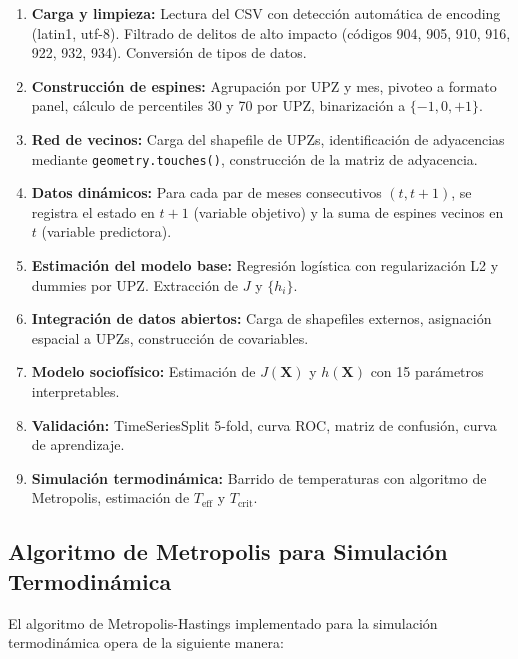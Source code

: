\documentclass[12pt,a4paper]{article}
\begin{document}
\begin{enumerate}
    \item \textbf{Carga y limpieza:} Lectura del CSV con detección automática de encoding (latin1, utf-8). Filtrado de delitos de alto impacto (códigos 904, 905, 910, 916, 922, 932, 934). Conversión de tipos de datos.
    
    \item \textbf{Construcción de espines:} Agrupación por UPZ y mes, pivoteo a formato panel, cálculo de percentiles 30 y 70 por UPZ, binarización a $\{-1, 0, +1\}$.
    
    \item \textbf{Red de vecinos:} Carga del shapefile de UPZs, identificación de adyacencias mediante \texttt{geometry.touches()}, construcción de la matriz de adyacencia.
    
    \item \textbf{Datos dinámicos:} Para cada par de meses consecutivos $(t, t+1)$, se registra el estado en $t+1$ (variable objetivo) y la suma de espines vecinos en $t$ (variable predictora).
    
    \item \textbf{Estimación del modelo base:} Regresión logística con regularización L2 y dummies por UPZ. Extracción de $J$ y $\{h_i\}$.
    
    \item \textbf{Integración de datos abiertos:} Carga de shapefiles externos, asignación espacial a UPZs, construcción de covariables.
    
    \item \textbf{Modelo sociofísico:} Estimación de $J(\mathbf{X})$ y $h(\mathbf{X})$ con 15 parámetros interpretables.
    
    \item \textbf{Validación:} TimeSeriesSplit 5-fold, curva ROC, matriz de confusión, curva de aprendizaje.
    
    \item \textbf{Simulación termodinámica:} Barrido de temperaturas con algoritmo de Metropolis, estimación de $T_{\text{eff}}$ y $T_{\text{crit}}$.
\end{enumerate}

\subsection{Algoritmo de Metropolis para Simulación Termodinámica}

El algoritmo de Metropolis-Hastings implementado para la simulación termodinámica opera de la siguiente manera:
\end{document}
